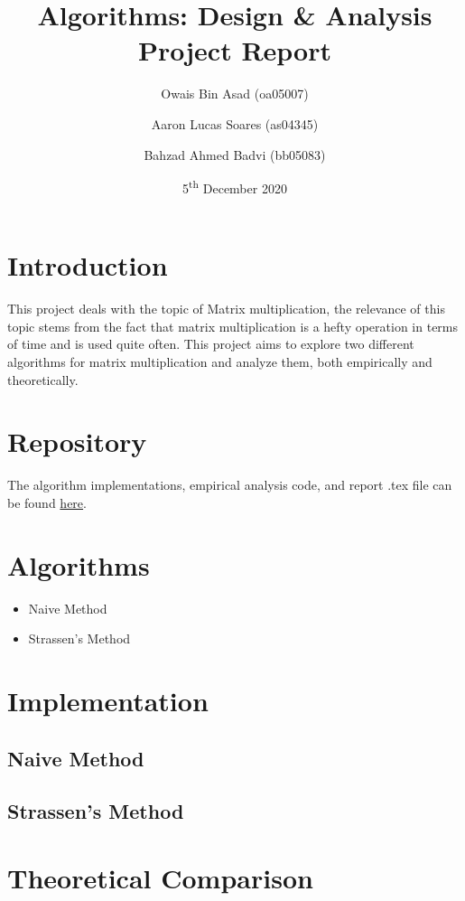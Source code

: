 \documentclass{article}
\title{Algorithms: Design \& Analysis\\Project Report}
\author{Owais Bin Asad (oa05007) \and Aaron Lucas Soares (as04345) \and Bahzad Ahmed Badvi (bb05083)}
\date{5\textsuperscript{th} December 2020}
\begin{document}
\maketitle

\section{Introduction}
This project deals with the topic of Matrix multiplication, the relevance of this topic stems from the fact that matrix multiplication is a hefty operation in terms of time and is used quite often. This project aims to explore two different algorithms for matrix multiplication and analyze them, both empirically and theoretically.

\section{Repository}
The algorithm implementations, empirical analysis code, and report .tex file can be found \href{https://www.google.com}{here}.

\section{Algorithms}
\begin{itemize}
    \item Naive Method
    \item Strassen's Method
\end{itemize}

\section{Implementation}
\subsection{Naive Method}


\subsection{Strassen's Method}


\section{Theoretical Comparison}
\end{document}
